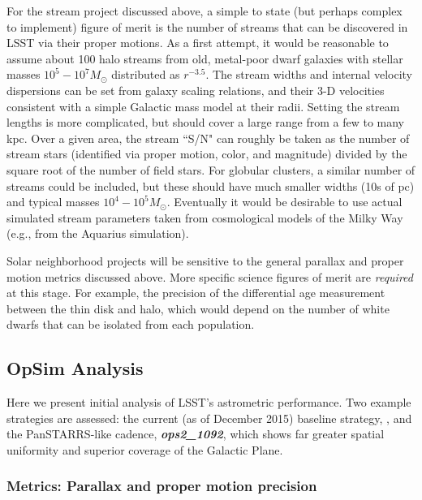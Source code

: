 For the stream project discussed above, a simple to state (but perhaps complex to implement) figure of merit
is the number of streams that can be discovered in LSST via their proper motions. As a first
attempt, it would be reasonable to assume about 100 halo streams from old, metal-poor dwarf galaxies with
stellar masses $10^5-10^7 M_{\odot}$ distributed as $r^{-3.5}$. The stream widths and internal velocity
dispersions can be set from galaxy scaling relations, and their 3-D velocities consistent with a simple Galactic mass
model at their radii. Setting the stream lengths is more complicated, but should cover a large range from a few to many kpc.
Over a given area, the stream ``S/N" can roughly be taken as the number of stream stars (identified via proper motion, color, and magnitude)
divided by the square root of the number of field stars. For globular clusters, a similar number of streams could be included, but these should have much smaller widths (10s of pc)
and typical masses $10^4-10^5 M_{\odot}$. Eventually it would be desirable to use actual simulated stream parameters taken from cosmological models of the Milky Way (e.g.,
from the Aquarius simulation).

Solar neighborhood projects will be sensitive to the general parallax and proper motion metrics discussed above. More specific science figures of merit are {\it required} at this stage.  For example, the precision of the differential age measurement between the thin disk and halo, which would depend on the number of white dwarfs that can be isolated
from each population.

\subsection{OpSim Analysis}
\label{sec:keyword:MW_Astrometry_OpSim}

Here we present initial analysis of LSST's astrometric
performance. Two example strategies are assessed: the current (as of
December 2015) baseline strategy, , and the
PanSTARRS-like cadence, {\it \bf ops2\_1092}, which shows far greater
spatial uniformity and superior coverage of the Galactic Plane.

\subsubsection{Metrics: Parallax and proper motion precision}


